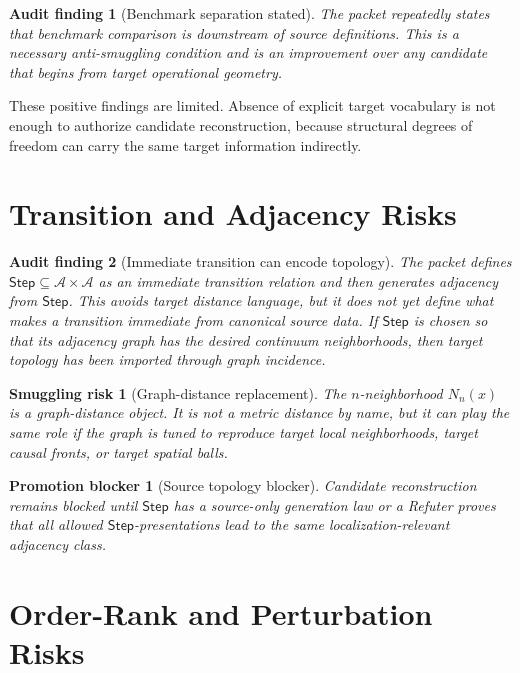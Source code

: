 \documentclass[11pt]{article}
\newcommand{\Sub}{\mathcal{A}}
\newcommand{\Step}{\mathsf{Step}}
\newtheorem{auditfinding}{Audit finding}
\newtheorem{smugglingrisk}{Smuggling risk}
\newtheorem{promotionblocker}{Promotion blocker}
\begin{document}
\begin{auditfinding}[Benchmark separation stated]
The packet repeatedly states that benchmark comparison is downstream of
source definitions. This is a necessary anti-smuggling condition and is an
improvement over any candidate that begins from target operational geometry.
\end{auditfinding}

These positive findings are limited. Absence of explicit target vocabulary is
not enough to authorize candidate reconstruction, because structural degrees
of freedom can carry the same target information indirectly.

\section{Transition and Adjacency Risks}

\begin{auditfinding}[Immediate transition can encode topology]
The packet defines \(\Step\subseteq\Sub\times\Sub\) as an immediate
transition relation and then generates adjacency from \(\Step\). This avoids
target distance language, but it does not yet define what makes a transition
immediate from canonical source data. If \(\Step\) is chosen so that its
adjacency graph has the desired continuum neighborhoods, then target topology
has been imported through graph incidence.
\end{auditfinding}

\begin{smugglingrisk}[Graph-distance replacement]
The \(n\)-neighborhood \(N_n(x)\) is a graph-distance object. It is not a
metric distance by name, but it can play the same role if the graph is tuned
to reproduce target local neighborhoods, target causal fronts, or target
spatial balls.
\end{smugglingrisk}

\begin{promotionblocker}[Source topology blocker]
Candidate reconstruction remains blocked until \(\Step\) has a source-only
generation law or a Refuter proves that all allowed \(\Step\)-presentations
lead to the same localization-relevant adjacency class.
\end{promotionblocker}

\section{Order-Rank and Perturbation Risks}
\end{document}
